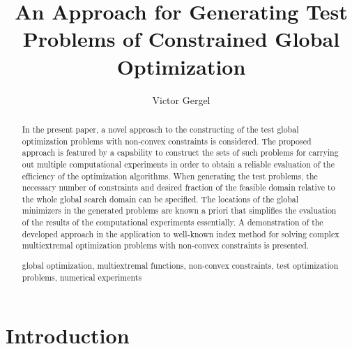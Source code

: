 \documentclass{llncs}
\begin{document}
\mainmatter 

\title{An Approach for Generating Test Problems of Constrained Global Optimization}
\author{Victor Gergel \\
}


\maketitle

\begin{abstract}
In the present paper, a novel approach to the constructing of the test global optimization problems with non-convex constraints is considered. The proposed approach is featured by a capability to construct the sets of such problems for carrying out multiple computational experiments in order to obtain a reliable evaluation of the efficiency of the optimization algorithms. When generating the test problems, the necessary number of constraints and desired fraction of the feasible domain relative to the whole global search domain can be specified. The locations of the global minimizers in the generated problems are known a priori that simplifies the evaluation of the results of the computational experiments essentially. A demonstration of the developed approach in the application to well-known index method for solving complex multiextremal optimization problems with non-convex constraints is presented.

\keywords global optimization, multiextremal functions, non-convex constraints, test optimization problems, numerical experiments

\end{abstract}

\section{Introduction}
\end{document}
